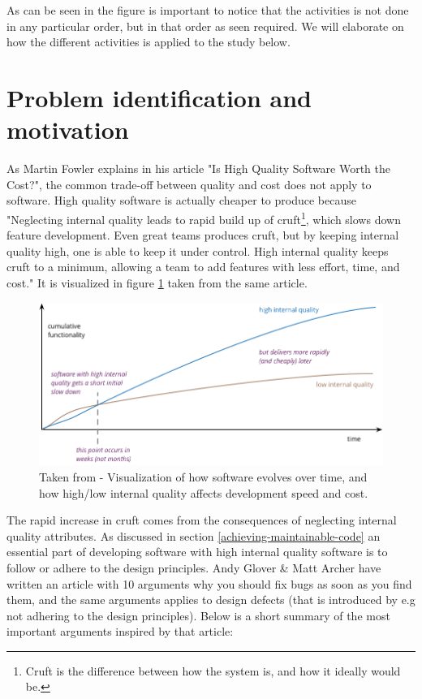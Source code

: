 \documentclass[pdftex,10pt,b5paper,twoside]{report}
\begin{document}
As can be seen in the figure is important to notice that the activities is not done in any particular order, but in that order as seen required. We will elaborate on how the different activities is applied to the study below. 

\section{Problem identification and motivation}
\label{problem-identification-and-motiviation}

As Martin Fowler explains in his article "Is High Quality Software Worth the Cost?"\cite{is-high-quality-softaware-worth-it}, the common trade-off between quality and cost does not apply to software. High quality software is actually cheaper to produce because "Neglecting internal quality leads to rapid build up of cruft\footnote{Cruft is the difference between how the system is, and how it ideally would be.}, which slows down feature development. Even great teams produces cruft, but by keeping internal quality high, one is able to keep it under control. High internal quality keeps cruft to a minimum, allowing a team to add features with less effort, time, and cost." It is visualized in figure \ref{fig:internal-quality-graph} taken from the same article.

\begin{figure}[h!]
    \centering
    \includegraphics[width=\linewidth]{report/internal-quality-graph.png}
    \caption{Taken from \cite{is-high-quality-softaware-worth-it} - Visualization of how software evolves over time, and how high/low internal quality affects development speed and cost.}
    \label{fig:internal-quality-graph}
\end{figure}

The rapid increase in cruft comes from the consequences of neglecting internal quality attributes. As discussed in section \ref{achieving-maintainable-code} an essential part of developing software with high internal quality software is to follow or adhere to the design principles. Andy Glover \& Matt Archer have written an article with 10 arguments why you should fix bugs as soon as you find them\cite{10reasons}, and the same arguments applies to design defects (that is introduced by e.g not adhering to the design principles). Below is a short summary of the most important arguments inspired by that article:
\end{document}
